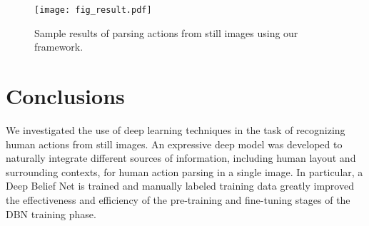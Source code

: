 \documentclass{article}
\begin{document}
\begin{figure}[htpb]
\centering
\texttt{[image: fig\_result.pdf]}
\vspace{-9mm}
\caption{Sample results of parsing actions from still images using our framework.}
\label{fig:result}
\end{figure}

\section{Conclusions}

We investigated the use of deep learning techniques in the task of recognizing human actions from still images.  An expressive deep model was developed to naturally integrate different sources of information, including human layout and surrounding contexts, for human action parsing in a single image.  In particular, a Deep Belief Net is trained and manually labeled training data greatly improved the effectiveness and efficiency of the pre-training and fine-tuning stages of the DBN training phase.  



\end{document}
